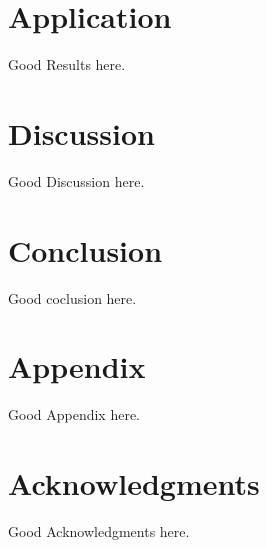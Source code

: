\documentclass[journal ]{new-aiaa}
\begin{document}
\section{Application}
Good Results here.

\section{Discussion}
Good Discussion here.

\section{Conclusion}
Good coclusion here.

\section*{Appendix}

Good Appendix here.

\section*{Acknowledgments}
Good Acknowledgments here.


\end{document}

